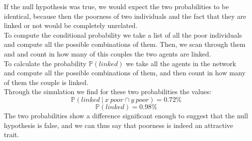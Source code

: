 If the null hypothesis was true, we would expect the two probabilities to be identical, because then the poorness of two individuals and the fact that they are linked or not would be completely unrelated. \\
To compute the conditional probability we take a list of all the poor individuals and compute all the possible combinations of them. Then, we scan through them and and count in how many of this couples the two agents are linked. \\
To calculate the probability $\mathbb{P}(linked)$ we take all the agents in the network and compute all the possible combinations of them, and then count in how many of them the couple is linked. \\
Through the simulation we find for these two probabilities the values:
$$
	\mathbb{P}(linked \ \vert \ x \ poor \cap y \ poor) = 0.72\%
$$
$$
	\mathbb{P}(linked) = 0.98\%
$$
The two probabilities show a difference significant enough to suggest that the null hypothesis is false, and we can thus say that poorness is indeed an attractive trait.
